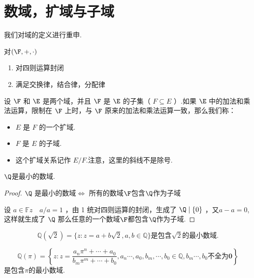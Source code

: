 \section{数域，扩域与子域}
我们对域的定义进行重申.
\begin{definition}\label{p1:concept:c1-l518}
	对$(\F,+,\cdot)$
	\begin{enumerate}
		\item 对四则运算封闭
		
		\item 满足交换律，结合律，分配律
	\end{enumerate}
\end{definition}
\begin{definition}\label{p1:concept:c1-l526}
	设 $\F$ 和 $\E$ 是两个域，并且 $\F$ 是 $\E$ 的子集（ $F \subseteq E$ ）.如果 $\E$ 中的加法和乘法运算，限制在 $\F$ 上时，与 $\F$ 原来的加法和乘法运算一致，那么我们称：
	\begin{itemize}
		\item  $E$ 是 $F$ 的一个扩域.
		\item $F$ 是 $E$ 的子域.
		\item 这个扩域关系记作 $E / F$.注意，这里的斜线不是除号.
	\end{itemize}
	
	
	
\end{definition}


\begin{proposition}
	$\Q$是最小的数域.
\end{proposition}
\begin{proof}
	$\Q$ 是最小的数域$\Leftrightarrow$ 所有的数域$\F$包含$\Q$作为子域
	
	设 $a \in \mathbb{F} z \quad a / a=1$ ，由 1 统对四则运算的封闭，生成了 $\Q\mid\left\{0\right\}$ ，又$ a-a=0$, 这样就生成了 $\Q$
	那么任意的一个数域$\F$都包含$\Q$作为子域.
	
\end{proof}

\begin{example}
	\[\mathbb{Q}(\sqrt{2})=\{z: z=a+b \sqrt{2}, a, b \in \mathbb{Q}\} \textbf{是包含} \sqrt{2}\textbf{的最小数域.} 
	\]
	
	\[\mathbb{Q}(\pi)=\left\{z: z=\frac{a_n \pi^n+\cdots+a_0}{b_m \pi^m+\cdots+b_0}, a_n \cdots, a_0, b_m, \cdots, b_0 \in \mathbb{Q}, b_m \cdots, b_0\textbf{不全为0}\right\}\]
	是包含$\pi$的最小数域.		
\end{example}
